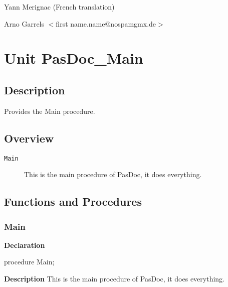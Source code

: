 \documentclass{report}
\newif\ifpdf
\begin{document}
\par
Yann Merignac (French translation)

\par
Arno Garrels {$<$}first name.name@nospamgmx.de{$>$}

\chapter{Unit PasDoc{\_}Main}
\label{PasDoc_Main}
\section{Description}
Provides the Main procedure.
\section{Overview}
\begin{description}
\item[\texttt{Main}]This is the main procedure of PasDoc, it does everything.
\end{description}
\section{Functions and Procedures}
\ifpdf
\subsection*{\large{\textbf{Main}}\normalsize\hspace{1ex}\hrulefill}
\else
\subsection*{Main}
\fi
\label{PasDoc_Main-Main}
\begin{list}{}{
\setlength{\itemindent}{0cm}
\setlength{\listparindent}{0cm}
\setlength{\leftmargin}{\evensidemargin}
\addtolength{\leftmargin}{\tmplength}
\settowidth{\labelsep}{X}
\addtolength{\leftmargin}{\labelsep}
\setlength{\labelwidth}{\tmplength}
}
\item[\textbf{Declaration}\hfill]
\ifpdf
\begin{flushleft}
\fi
\begin{ttfamily}
procedure Main;\end{ttfamily}

\ifpdf
\end{flushleft}
\fi

\par
\item[\textbf{Description}]
This is the main procedure of PasDoc, it does everything.

\end{list}
\end{document}
